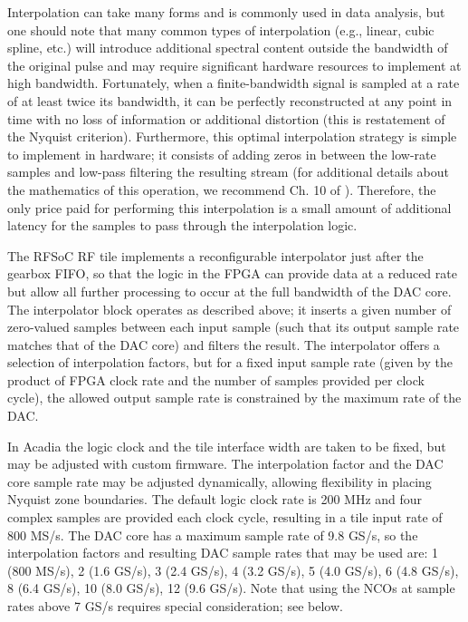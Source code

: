 Interpolation can take many forms and is commonly used in data analysis, but one should note that many common types of interpolation (e.g., linear, cubic spline, etc.) will introduce additional spectral content outside the bandwidth of the original pulse and may require significant hardware resources to implement at high bandwidth. Fortunately, when a finite-bandwidth signal is sampled at a rate of at least twice its bandwidth, it can be perfectly reconstructed at any point in time with no loss of information or additional distortion (this is restatement of the Nyquist criterion). Furthermore, this optimal interpolation strategy is simple to implement in hardware; it consists of adding zeros in between the low-rate samples and low-pass filtering the resulting stream (for additional details about the mathematics of this operation, we recommend Ch. 10 of \cite{lyons}). Therefore, the only price paid for performing this interpolation is a small amount of additional latency for the samples to pass through the interpolation logic.

The RFSoC RF tile implements a reconfigurable interpolator just after the gearbox FIFO, so that the logic in the FPGA can provide data at a reduced rate but allow all further processing to occur at the full bandwidth of the DAC core. The interpolator block operates as described above; it inserts a given number of zero-valued samples between each input sample (such that its output sample rate matches that of the DAC core) and filters the result. The interpolator offers a selection of interpolation factors, but for a fixed input sample rate (given by the product of FPGA clock rate and the number of samples provided per clock cycle), the allowed output sample rate is constrained by the maximum rate of the DAC.

In Acadia the logic clock and the tile interface width are taken to be fixed, but may be adjusted with custom firmware. The interpolation factor and the DAC core sample rate may be adjusted dynamically, allowing flexibility in placing Nyquist zone boundaries. The default logic clock rate is 200 MHz and four complex samples are provided each clock cycle, resulting in a tile input rate of 800 MS/s. The DAC core has a maximum sample rate of 9.8 GS/s, so the interpolation factors and resulting DAC sample rates that may be used are: 1 (800 MS/s), 2 (1.6 GS/s), 3 (2.4 GS/s), 4 (3.2 GS/s), 5 (4.0 GS/s), 6 (4.8 GS/s), 8 (6.4 GS/s), 10 (8.0 GS/s), 12 (9.6 GS/s). Note that using the NCOs at sample rates above 7 GS/s requires special consideration; see below. 

